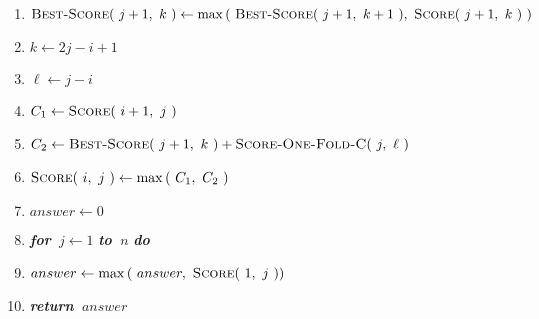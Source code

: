 \documentclass[11pt]{article}
\newcommand{\xfor}{{\bf{\em{for~}}}}
\newcommand{\xto}{{\bf{\em{to~}}}}
\newcommand{\xdo}{{\bf{\em{do~}}}}
\newcommand{\xreturn}{{\bf{\em{return~}}}}
\newcommand{\T}{\hspace{0.5cm}}
\def\comment#1{\hfill{\color{gray}{$\left\{\textrm{{\em{#1}}}\right\}$}}}
\def\func#1{\textrm{\bf{\sc{#1}}}}
\def\mfunc#1{\mbox{\func{#1}}}
\begin{document}
\begin{figure*}[p!]
\begin{minipage}{\textwidth}
\begin{center}
{\begin{minipage}{\textwidth}
{\begin{enumerate}[1.]
                            \item \T \T \T \T \T $\mfunc{Best-Score}(~j+1, ~k ~) \gets \max{(~\mfunc{Best-Score}(~j+1,~k+1~),~\mfunc{Score}(~j+1,~k~)~)}$
                            \item \T \T \T $k \gets 2j-i+1$
                                \comment{$j-i = k-j-1$}
                            \item \T \T \T $\ell \gets j-i$
                            \item \T \T \T $C_1 \gets \mfunc{Score}(~i+1,~j~)$
                            \item \T \T \T $C_2 \gets \mfunc{Best-Score}(~j+1,~k~) + \mfunc{Score-One-Fold-C}(~j,~\ell~)$
                            \item \T \T \T $\mfunc{Score}(~i,~j~) \gets \max{(~C_1,~C_2~)}$
                            \item $answer \gets 0$
                            \item \xfor $j \gets 1$ \xto $n$ \xdo
                            \item \T $answer \gets \max{(~answer, ~\mfunc{Score}(~1, ~j~))}$
                            \item \xreturn $answer$
                        \end{enumerate}

                    }
                \end{minipage}
                \vspace{0.1cm}
            }

        \end{center}
    \end{minipage}
\end{figure*}
\end{document}
